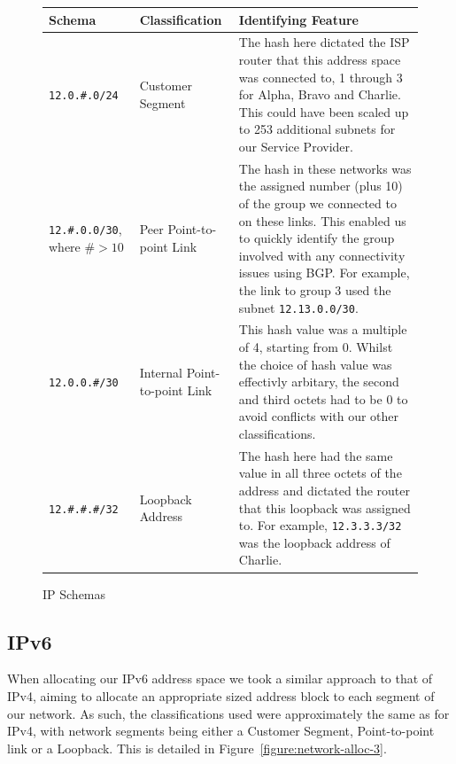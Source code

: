 \begin{figure}[!ht]
    \caption{IP Schemas}
    \label{figure:network-alloc-2}
    \centering
    \begin{tabular}{|p{3cm}|p{3cm}|p{5cm}|}

        \hline
        \textbf{Schema} & \textbf{Classification} & \textbf{Identifying Feature} \\

        \hline
        \texttt{12.0.\#.0/24} & Customer Segment & The hash here dictated the
        ISP router that this address space was connected to, 1 through 3 for
        Alpha, Bravo and Charlie. This could have been scaled up to 253
        additional subnets for our Service Provider.\\
        \hline
        \texttt{12.\#.0.0/30}, where $\#> 10$ & Peer Point-to-point Link &
        The hash in these networks was the assigned number (plus 10) of the group we
        connected to on these links. This enabled us to quickly identify the
        group involved with any connectivity issues using BGP. For example, the
        link to group 3 used the subnet \texttt{12.13.0.0/30}.\\
        \hline
        \texttt{12.0.0.\#/30} & Internal Point-to-point Link &
        This hash value was a multiple of 4, starting from 0. Whilst the choice
        of hash value was effectivly arbitary, the second and third octets had
        to be 0 to avoid conflicts with our other classifications.\\
        \hline
        \texttt{12.\#.\#.\#/32} & Loopback Address & The hash here had
        the same value in all three octets of the address and dictated the
        router that this loopback was assigned to. For example,
        \texttt{12.3.3.3/32} was the loopback address of Charlie.\\

        \hline
    \end{tabular}
\end{figure}

\clearpage

\subsection{IPv6}
When allocating our IPv6 address space we took a similar approach to that of
IPv4, aiming to allocate an appropriate sized address block to each segment of
our network. As such, the classifications used were approximately the same as
for IPv4, with network segments being either a Customer Segment, Point-to-point
link or a Loopback. This is detailed in Figure~\ref{figure:network-alloc-3}.


